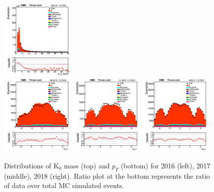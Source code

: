 \documentclass{cernatlasnote}
\begin{document}
\begin{figure}[htp]
 \includegraphics[width=0.32\textwidth]{images/emu_channel/2018/18_Range_0pt7_1pt3/Reco_K0_pt__Linear.png}\\
  \includegraphics[width=0.32\textwidth]{images/emu_channel/2016/16_Range_0pt7_1pt3/Reco_K0_eta__Linear.png}
\includegraphics[width=0.32\textwidth]{images/emu_channel/2017/17_Range_0pt7_1pt3/Reco_K0_eta__Linear.png}
 \includegraphics[width=0.32\textwidth]{images/emu_channel/2018/18_Range_0pt7_1pt3/Reco_K0_eta__Linear.png}
 \caption{Distributions of K$_{0}$ mass (top) and $p_{T}$ (bottom) for 2016 (left), 2017 (middle), 2018 (right). Ratio plot at the bottom represents the ratio of data over total MC simulated events.}
 \label{fig:mu_dist}
  \end{figure}
\end{document}
